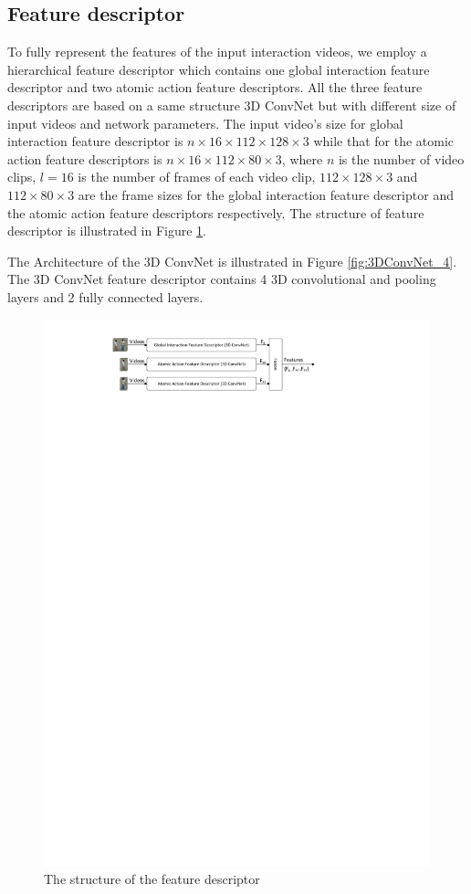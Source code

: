 \subsection{Feature descriptor}
To fully represent the features of the input interaction videos, we employ a hierarchical feature descriptor which contains one global interaction feature descriptor and two atomic action feature descriptors. All the three feature descriptors are based on a same structure 3D ConvNet but with different size of input videos and network parameters. The input video's size for global interaction feature descriptor is \(n \times 16 \times 112 \times 128 \times 3\) while that for the atomic action feature descriptors is \(n \times 16 \times 112 \times 80 \times 3\), where \(n\) is the number of video clips, \(l = 16\) is the number of frames of each video clip, \(112 \times 128 \times 3\) and \(112 \times 80 \times 3\) are the frame sizes for the global interaction feature descriptor and the atomic action feature descriptors respectively. The structure of feature descriptor is illustrated in Figure \ref{fig:feature_descriptor}.  
\par
\label{3dconv_layers}
The Architecture of the 3D ConvNet is illustrated in Figure \ref{fig:3DConvNet_4}. The 3D ConvNet feature descriptor contains 4 3D convolutional and pooling layers and 2 fully connected layers.  
\begin{figure}
	\includegraphics[trim=2cm 25.5cm 0cm 1cm]{fig01/feature_descriptor.pdf}
	\caption{The structure of the feature descriptor}
	\label{fig:feature_descriptor}
\end{figure} 

